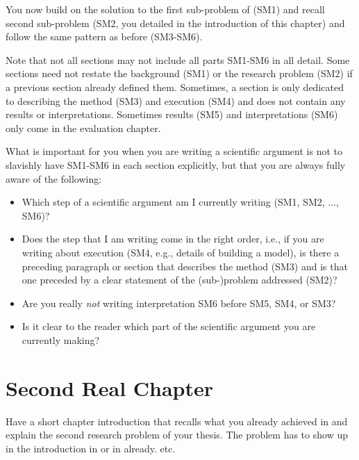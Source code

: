 You now build on the solution to the first sub-problem of  (SM1) and recall second sub-problem (SM2, you detailed in the introduction of this chapter) and follow the same pattern as before (SM3-SM6).

Note that not all sections may not include all parts SM1-SM6 in all detail.
Some sections need not restate the background (SM1) or the research problem (SM2) if a previous section already defined them.
Sometimes, a section is only dedicated to describing the method (SM3) and execution (SM4) and does not contain any results or interpretations.
Sometimes results (SM5) and interpretations (SM6) only come in the evaluation chapter.

What is important for you when you are writing a scientific argument is not to slavishly have SM1-SM6 in each section explicitly, but that you are always fully aware of the following:
%
\begin{itemize}
  \item Which step of a scientific argument am I currently writing (SM1, SM2, ..., SM6)?
  \item Does the step that I am writing come in the right order, i.e., if you are writing about execution (SM4, e.g., details of building a model), is there a preceding paragraph or section that describes the method (SM3) and is that one preceded by a clear statement of the (sub-)problem addressed (SM2)?
  \item Are you really \emph{not} writing interpretation SM6 before SM5, SM4, or SM3?
  \item Is it clear to the reader which part of the scientific argument you are currently making?
\end{itemize}

\section{Second Real Chapter}\label{sec:sub-problem2}

Have a short chapter introduction that recalls what you already achieved in  and explain the second research problem of your thesis.
The problem has to show up in the introduction in  or in  already.
etc.

